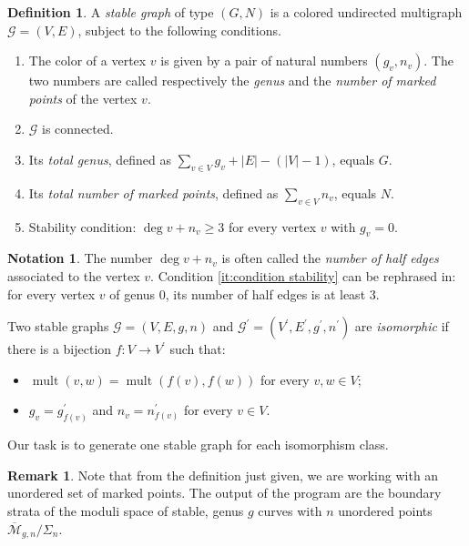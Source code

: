 \documentclass{amsart}
\theoremstyle{plain}
\theoremstyle{definition}
\newtheorem{remark}[theorem]{Remark}
\newtheorem{definition}[theorem]{Definition}
\newtheorem{notation}[theorem]{Notation}
\DeclareMathOperator{\mult}{mult}
\newcommand{\graph}{\mathcal{G}}
\newcommand{\abs}[1]{\left|#1\right|}
\begin{document}
\begin{definition}\label{def:stable graph}
  A \emph{stable graph\/} of type $(G, N)$ is a colored undirected
  multigraph $\graph = (V, E)$, subject to the following conditions.
  \begin{enumerate}
  \item The color of a vertex $v$ is given by a pair of natural
    numbers $(g_v, n_v)$. The two numbers are called respectively the
    \emph{genus} and the \emph{number of marked points} of the vertex
    $v$.
  \item\label{it:condition connected} $\graph$ is connected.
  \item\label{it:condition genus} Its \emph{total genus}, defined as
    $\sum_{v \in V} g_v + \abs{E} - (\abs{V} - 1)$, equals $G$.
  \item Its \emph{total number of marked points}, defined as $\sum_{v
      \in V} n_v$, equals $N$.
  \item\label{it:condition stability} Stability condition: $\deg v +
    n_v \geq 3$ for every vertex $v$ with $g_v = 0$.
  \end{enumerate}
\end{definition}

\begin{notation}
  The number $\deg v + n_v$ is often called the \emph{number of half
    edges\/} associated to the vertex $v$. Condition \ref{it:condition
    stability} can be rephrased in: for every vertex $v$ of genus $0$,
  its number of half edges is at least $3$.
\end{notation}

Two stable graphs $\graph = (V, E, g, n)$ and $\graph^\prime =
(V^\prime, E^\prime, g^\prime, n^\prime)$ are \emph{isomorphic\/} if
there is a bijection $f\colon V \to V^\prime$ such that:
\begin{itemize}
\item $\mult(v, w) = \mult(f(v), f(w))$ for every $v, w \in V$;
\item $g_v = g^\prime_{f(v)}$ and $n_v = n^\prime_{f(v)}$ for every $v
  \in V$.
\end{itemize}
Our task is to generate one stable graph for each isomorphism class.

\begin{remark}
  Note that from the definition just given, we are working with an
  unordered set of marked points. The output of the program are the
  boundary strata of the moduli space of stable, genus $g$ curves with
  $n$ unordered points $\overline{\mathcal{M}}_{g,n}/ \Sigma_n$.
\end{remark}
\end{document}
